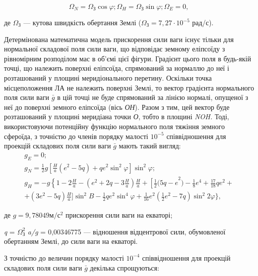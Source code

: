 \[\Omega_{N} =\Omega_{\text{З}}\cos \varphi;
\Omega_{H} =\Omega_{\text{З}}\sin \varphi; 
\Omega_{E} =0,\] 

\begin{ESKDexplanation}
 \item де  $\Omega_{\text{З}} $ --- кутова швидкість обертання Землі ($\Omega_{\text{З}}=7,27 \cdot 10^{-5}$ рад/с).
\end{ESKDexplanation}

Детермінована математична модель прискорення сили ваги існує тільки для нормальної 
складової поля сили ваги, що відповідає земному еліпсоїду з рівномірним розподілом 
мас в об'ємі цієї фігури. Градієнт цього поля в будь-якій точці, що належить поверхні 
еліпсоїда, спрямований за нормаллю до неї і розташований у площині меридіонального 
перетину. Оскільки точка місцеположення ЛА не належить поверхні Землі, то вектор 
градієнта нормального поля сили ваги $\bar{g}$ в цій точці не буде спрямований за 
лінією нормалі, опущеної з неї до поверхні земного еліпсоїда (вісь \textit{ОН}). 
Разом з тим, цей вектор буде розташований у площині меридіана точки \textit{О}, тобто 
в площині \textit{NOH. }Тоді, використовуючи  потенційну функцію нормального поля 
тяжіння земного сфероїда, з точністю до членів порядку малості $10^{-5}$  співвідношення 
для проекцій складових поля сили ваги $\bar{g}$ мають такий вигляд:
\[\begin{array}{l} 
{g_{E} =0;} \\
{g_{N} =\frac{1}{2} g[\frac{H}{a} (e^{2} -5q)+qe^{2} \sin^{2}\varphi]\sin^2\varphi;}\\
{g_{H} =-g\left\{1-2\frac{H}{a} -\right. (e^{2} +2q-3\frac{H}{a})
\frac{H}{a} +\left[\frac{1}{2} (5q-e\right. ^{2} )-\frac{1}{8} e^{4} +\frac{17}{18}qe^{2} +} \\ 
{ +(3e^{2} - 5q)\frac{H}{a} ]\sin ^{2} B-\frac{1}{2} qe^{2} \sin ^{4} \varphi+\frac{1}{16} e^{2} 
(\frac{1}{2} e^{2} -7q)\sin ^{2} 2\varphi\},} 
\end{array}\]
\begin{ESKDexplanation}
\item де $g= 9,78049 \text{м}/\text{с}^{2}$ прискорення сили ваги на екваторі; 
\item \textit{q} = $\Omega_{\text{З}}^{2} $ \textit{a/g} = 0,00346775 --- відношення 
відцентрової сили, обумовленої обертанням Землі, до сили ваги на екваторі. 
\end{ESKDexplanation}

З точністю до величин порядку малості $10^{-4}$ співвідношення для проекцій складових 
поля сили ваги $\bar{g}$ декілька спрощуються:


